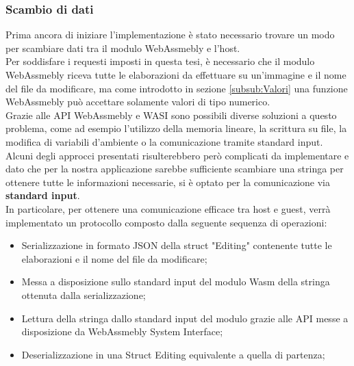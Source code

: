 \subsubsection{Scambio di dati}
Prima ancora di iniziare l'implementazione è stato necessario trovare un modo per scambiare dati tra il modulo WebAssmebly e l'host.
\\Per soddisfare i requesti imposti in questa tesi, è necessario che il modulo WebAssmebly riceva tutte le elaborazioni da effettuare su un'immagine e il nome del file da modificare, ma come introdotto in sezione \ref{subsub:Valori} una funzione WebAssmebly può accettare solamente valori di tipo numerico.
\\Grazie alle API WebAssmebly e WASI sono possibili diverse soluzioni a questo problema, come ad esempio l'utilizzo della memoria lineare, la scrittura su file, la modifica di variabili d'ambiente o la comunicazione tramite standard input.
Alcuni degli approcci presentati risulterebbero però complicati da implementare e dato che per la nostra applicazione sarebbe sufficiente scambiare una stringa per ottenere tutte le informazioni necessarie, si è optato per la comunicazione via \textbf{standard input}.
\\In particolare, per ottenere una comunicazione efficace tra host e guest, verrà implementato un protocollo composto dalla seguente sequenza di operazioni:
\begin{itemize}
    \item Serializzazione in formato JSON della struct "Editing" contenente tutte le elaborazioni  e il nome del file da modificare;
    \item Messa a disposizione sullo standard input del modulo Wasm della stringa ottenuta dalla serializzazione;
    \item Lettura della stringa dallo standard input del modulo  grazie alle API messe a disposizione da WebAssmebly System Interface;
    \item Deserializzazione in una Struct Editing equivalente a quella di partenza;
\end{itemize}
\newpage
